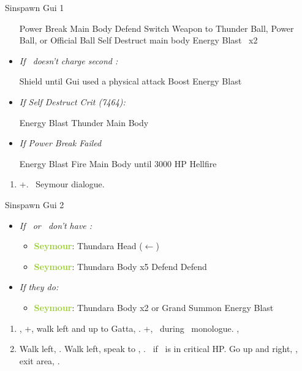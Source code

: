 \begin{battle}[12000]{Sinspawn Gui 1}
	\begin{itemize}
		\switch{\yuna}{\auron}
		\auronf Power Break Main Body
		\tidusf Defend
		\wakkaf Switch Weapon to Thunder Ball, Power Ball, or Official Ball
		\switch{\wakka}{\kimahri}
		\kimahrif Self Destruct main body
		\switch{\tidus}{\yuna}
		\summon{\valefor}
		\valeforf Energy Blast \od\ x2
		\item \textit{If \valefor\ doesn't charge second \od:}
		      \begin{itemize}
			      \valeforf Shield until Gui used a physical attack
			      \valeforf Boost
			      \valeforf Energy Blast \od
		      \end{itemize}
		\item \textit{If Self Destruct Crit \textit{(7464)}:}
		      \begin{itemize}
			      \valeforf Energy Blast
			      \valeforf Thunder Main Body
		      \end{itemize}
		\item \textit{If Power Break Failed}
		      \begin{itemize}
			      \valeforf Energy Blast
			      \summon{\ifrit}
			      \ifritf Fire Main Body until 3000 HP
			      \ifritf Hellfire
		      \end{itemize}
	\end{itemize}
\end{battle}
\begin{enumerate}[resume]
	\item \cs+\skippablefmv[2:20]. \sd\ Seymour dialogue.
\end{enumerate}
\begin{battle}[6000]{Sinspawn Gui 2}
	\begin{itemize}
		\item \textit{If \yuna\ or \valefor\ don't have \od:}
		      \begin{itemize}
			      \item \textbf{\textcolor{YellowGreen}{Seymour}}: Thundara Head ($\leftarrow$)
			      \item \textbf{\textcolor{YellowGreen}{Seymour}}: Thundara Body x5
			            \yunaf Defend
			            \auronf Defend
		      \end{itemize}
		\item \textit{If they do:}
		      \begin{itemize}
			      \item \textbf{\textcolor{YellowGreen}{Seymour}}: Thundara Body x2
			            \summon{\valefor} or Grand Summon \valefor
			            \valeforf Energy Blast
		      \end{itemize}
	\end{itemize}
\end{battle}
\begin{enumerate}[resume]
	\item \sd, \cs+\skippablefmv[2:00], walk left and up to Gatta, \sd. \fmv+\cs[1:30], \sd\ during \tidus\ monologue. \cs[1:00], \sd
	\item Walk left, \sd. Walk left, speak to \auron, \sd. \save\ if \auron\ is in critical HP. Go up and right, \sd, exit area, \sd.
\end{enumerate}


